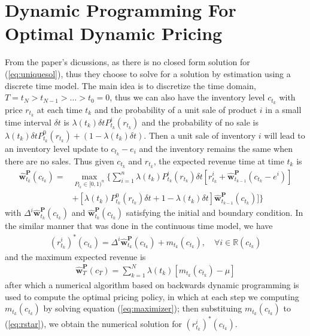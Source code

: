 

\section{Dynamic Programming For Optimal Dynamic Pricing}

From the paper's dicussions, as there is no closed form solution for (\ref{eq:uniquesol}), thus they choose to solve for a solution by estimation using a discrete time model. The main idea is to discretize the time domain, $T = t_N > t_{N-1}>\ldots>t_0=0$, thus we can also have the inventory level $c_{t_k}$ with price $r_{t_k}$ at each time $t_k$ and the probability of a unit sale of product $i$ in a small time interval $\delta t$ is $\lambda(t_k)\delta t P_{t_k}^i(r_{t_k})$ and the probability of no sale is $\lambda(t_k)\delta t P_{t_k}^0(r_{t_k}) + (1 - \lambda(t_k)\delta t)$. Then a unit sale of inventory $i$ will lead to an inventory level update to $c_{t_k}-e_i$ and the inventory remains the same when there are no sales. Thus given $c_{t_k}$ and $r_{t_k}$, the expected revenue time at time $t_k$ is \cite{Dong2009}
\begin{align*}
\hat{\mathbf{w}}_{t_k}^{\mathbf{P}}(c_{t_k}) = &\max_{P_{t_k}\in[0,1)^n} \Bigg\{\sum_{i=1}^{n}\lambda(t_k)P^i_{t_k}(r_{t_k})\delta t [r_{t_k}^i + \hat{\mathbf{w}}_{t_{k-1}}^{\mathbf{P}}(c_{t_k}-e^i)] \\
&+ [\lambda(t_k)P_{t_k}^0(r_{t_k})\delta t + 1 -\lambda(t_k) \delta t]\hat{\mathbf{w}}_{t_{k-1}}^{\mathbf{P}}(c_{t_k})]\Bigg\}
\end{align*}
with $\Delta^i\hat{\mathbf{w}}_{t_k}^{\mathbf{P}}(c_{t_k})$ and $\hat{\mathbf{w}}_{t_k}^{\mathbf{P}}(c_{t_k})$ satisfying the initial and boundary condition. In the similar manner that was done in the continuous time model, we have
\begin{align}
(r_{t_k}^i)^\ast (c_{t_k}) = \Delta^i \hat{\mathbf{w}}_{t_k}^{\mathbf{P}}(c_{t_k}) + m_{t_k}(c_{t_k}), \quad \forall i \in \mathbb{R}(c_{t_k}) \label{eq:rstar}
\end{align}
and the maximum expected revenue is
\begin{align*}
\hat{\mathbf{w}}_{T}^{\mathbf{P}}(c_{T}) = \sum_{k=1}^{N}\lambda(t_k)[m_{t_k}(c_{t_k})-\mu]
\end{align*}
after which a numerical algorithm based on backwards dynamic programming is used to compute the optimal pricing policy, in which at each step we computing $m_{t_k}(c_{t_k})$ by solving equation (\ref{eq:maximizer}); then substituing $m_{t_k}(c_{t_k})$ to (\ref{eq:rstar}), we obtain the numerical solution for $(r_{t_k}^i)^\ast(c_{t_k})$.
